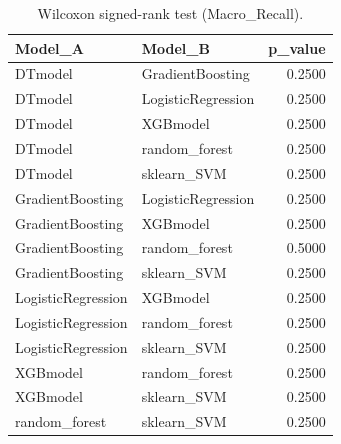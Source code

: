 \begin{table}[t]
\centering
\begin{tabular}{llr}
\toprule
Model_A & Model_B & p_value \\
\midrule
DTmodel & GradientBoosting & 0.2500 \\
DTmodel & LogisticRegression & 0.2500 \\
DTmodel & XGBmodel & 0.2500 \\
DTmodel & random_forest & 0.2500 \\
DTmodel & sklearn_SVM & 0.2500 \\
GradientBoosting & LogisticRegression & 0.2500 \\
GradientBoosting & XGBmodel & 0.2500 \\
GradientBoosting & random_forest & 0.5000 \\
GradientBoosting & sklearn_SVM & 0.2500 \\
LogisticRegression & XGBmodel & 0.2500 \\
LogisticRegression & random_forest & 0.2500 \\
LogisticRegression & sklearn_SVM & 0.2500 \\
XGBmodel & random_forest & 0.2500 \\
XGBmodel & sklearn_SVM & 0.2500 \\
random_forest & sklearn_SVM & 0.2500 \\
\bottomrule
\end{tabular}
\caption{Wilcoxon signed-rank test (Macro_Recall).}
\label{tab:wilcoxon_Macro_Recall}
\end{table}